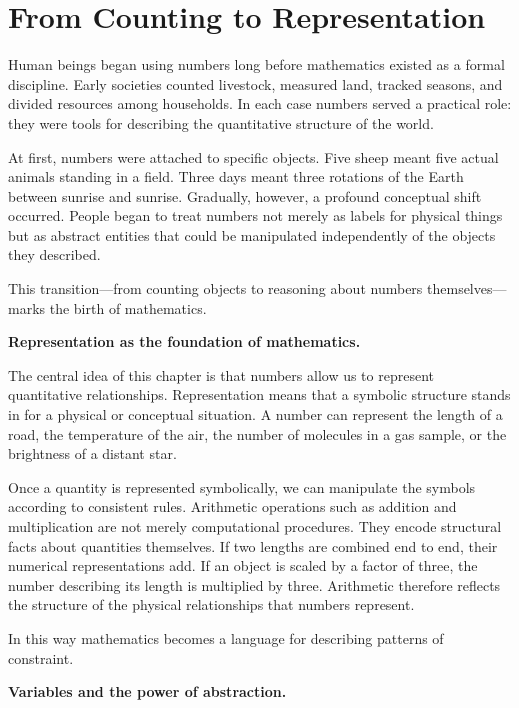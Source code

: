 \documentclass[11pt, openany]{book}
\theoremstyle{plain}
\theoremstyle{definition}
\theoremstyle{remark}
\begin{document}
\section*{From Counting to Representation}

Human beings began using numbers long before mathematics existed as a
formal discipline. Early societies counted livestock, measured land,
tracked seasons, and divided resources among households. In each case
numbers served a practical role: they were tools for describing the
quantitative structure of the world.

At first, numbers were attached to specific objects. Five sheep meant
five actual animals standing in a field. Three days meant three rotations
of the Earth between sunrise and sunrise. Gradually, however, a profound
conceptual shift occurred. People began to treat numbers not merely as
labels for physical things but as abstract entities that could be
manipulated independently of the objects they described.

This transition—from counting objects to reasoning about numbers
themselves—marks the birth of mathematics.

\medskip

\textbf{Representation as the foundation of mathematics.}

The central idea of this chapter is that numbers allow us to represent
quantitative relationships. Representation means that a symbolic
structure stands in for a physical or conceptual situation. A number can
represent the length of a road, the temperature of the air, the number of
molecules in a gas sample, or the brightness of a distant star.

Once a quantity is represented symbolically, we can manipulate the
symbols according to consistent rules. Arithmetic operations such as
addition and multiplication are not merely computational procedures.
They encode structural facts about quantities themselves. If two lengths
are combined end to end, their numerical representations add. If an
object is scaled by a factor of three, the number describing its length
is multiplied by three. Arithmetic therefore reflects the structure of
the physical relationships that numbers represent.

In this way mathematics becomes a language for describing patterns of
constraint.

\medskip

\textbf{Variables and the power of abstraction.}
\end{document}
